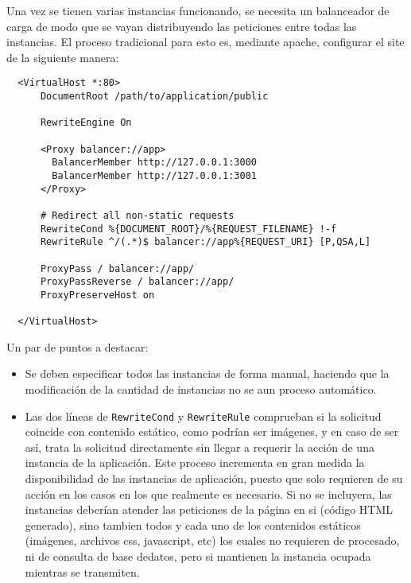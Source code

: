 Una vez se tienen varias instancias funcionando, se necesita un balanceador de carga de modo que se vayan distribuyendo las peticiones entre todas las instancias. El proceso tradicional para esto es, mediante apache, configurar el site de la siguiente manera:

\begin{verbatim}
  <VirtualHost *:80>
      DocumentRoot /path/to/application/public
      
      RewriteEngine On
      
      <Proxy balancer://app>
        BalancerMember http://127.0.0.1:3000
        BalancerMember http://127.0.0.1:3001
      </Proxy>
      
      # Redirect all non-static requests
      RewriteCond %{DOCUMENT_ROOT}/%{REQUEST_FILENAME} !-f
      RewriteRule ^/(.*)$ balancer://app%{REQUEST_URI} [P,QSA,L]

      ProxyPass / balancer://app/
      ProxyPassReverse / balancer://app/
      ProxyPreserveHost on
      
  </VirtualHost>
\end{verbatim}

Un par de puntos a destacar:

\begin{itemize}
  \item Se deben especificar todos las instancias de forma manual, haciendo que la modificación de la cantidad de instancias no se aun proceso automático.
  \item Las dos líneas de \texttt{RewriteCond} y \texttt{RewriteRule} comprueban si la solicitud coincide con contenido estático, como podrían ser imágenes, y en caso de ser así, trata la solicitud directamente sin llegar a requerir la acción de una instancia de la aplicación. Este proceso incrementa en gran medida la disponibilidad de las instancias de aplicación, puesto que solo requieren de su acción en los casos en los que realmente es necesario. Si no se incluyera, las instancias deberían atender las peticiones de la página en si (código HTML generado), sino tambien todos y cada uno de los contenidos estáticos (imágenes, archivos css, javascript, etc) los cuales no requieren de procesado, ni de consulta de base dedatos, pero si mantienen la instancia ocupada mientras se transmiten.
\end{itemize}


